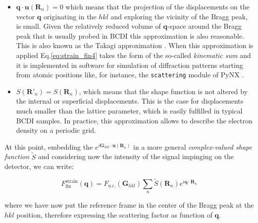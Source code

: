 \begin{itemize}

    \item $\mathbf{q}\cdot\mathbf{u}(\mathbf{R}_n) = 0 $ which means that the projection of the displacements on the vector 
    $\mathbf{q}$ originating in the $hkl$ and exploring the vicinity of the Bragg peak, is small. Given the relatively 
    reduced volume of $\mathbf{q}$-space around the Bragg peak that is usually probed in BCDI this approximation is 
    also reasonable. This is also known as the Takagi approximation \cite{takagi1969dynamical}. When this approximation is applied Eq.\ref{eq:strain_fin4} takes the form of the so-called \textit{kinematic sum}
    and it is implemented in software for simulation of diffraction 
    patterns starting from atomic positions like, for instance, the \texttt{scattering} module of PyNX \cite{pynx_scattering}. 

    \item $ S(\mathbf{R}'_n) = S(\mathbf{R}_n)$, which means that the shape function is not altered by the internal or superficial 
    displacements. This is the case for displacements much smaller than the lattice parameter, which is easily fulfilled in 
    typical BCDI samples. In practice, this approximation allows to describe the electron density on a periodic grid. 
     
\end{itemize}

At this point, embedding the $e^{i \mathbf{G}_{hkl} \cdot  \mathbf{u}(\mathbf{R}_n) }$ in a more general \textit{complex-valued 
shape function} $\tilde{S}$ and considering now the intensity of the signal impinging on the detector, we can write: 

\begin{equation}
    F^{\text{strain}}_{\text{fin}}(\mathbf{q}) = F_{\text{u.c.}}(\mathbf{G}_{hkl}) \sum_{n} \tilde{S}(\mathbf{R}_n) e^{i \mathbf{q} \cdot  \mathbf{R}_n }
    \label{eq:strain_fin4}
\end{equation}

where we have now put the reference frame in the center of the Bragg peak at the $hkl$ position, therefore expressing 
the scattering factor as function of $\mathbf{q}$.


